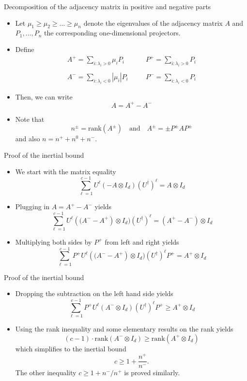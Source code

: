 \documentclass{beamer}
\renewcommand{\>}{\rangle}
\newcommand{\<}{\langle}
\begin{document}
%

\begin{frame}{Decomposition of the adjacency matrix in positive and negative parts}

\begin{itemize}
\item Let $\mu_1\ge \mu_2\ge \ldots \ge \mu_n$ denote the eigenvalues of the adjacency matrix $A$ and $P_1,\ldots,P_n$ the corresponding one-dimensional projectors.

\item Define 
\[
\begin{array}{lll}
A^+ = \sum_{i : \lambda_i > 0} \mu_i P_i & \quad &
P^+ = \sum_{i : \lambda_i > 0} P_i \\
\\
A^- = \sum_{i : \lambda_i < 0} |\mu_i| P_i & \quad &
P^- = \sum_{i : \lambda_i < 0} P_i 
\end{array}
\]
\item 
Then, we can write
\[
A = A^+ - A^-
\]
\item Note that
\[
n^{\pm} = \mathrm{rank}(A^{\pm})
\quad\mbox{and}\quad
A^{\pm} = \pm P^{\pm} A P^{\pm}
\]
and also $n=n^+ + n^0 + n^-$.
\end{itemize}

\end{frame}

%

\begin{frame}{Proof of the inertial bound}
\begin{itemize}
\item We start with the matrix equality
\[
\sum_{\ell=1}^{c-1} U^\ell (-A\otimes I_d) (U^\dagger)^\ell = A \otimes I_d
\]
\item Plugging in $A=A^+ - A^-$ yields
\[
\sum_{\ell=1}^{c-1} U^\ell \left((A^- - A^+\right) \otimes I_d) (U^\dagger)^\ell = (A^+ - A^-) \otimes I_d
\]
\item Multiplying both sides by $P^+$ from left and right yields
\[
\sum_{\ell=1}^{c-1} P^+ U^\ell \left((A^- - A^+\right) \otimes I_d) (U^\dagger)^\ell P^+= A^+ \otimes I_d
\]
\end{itemize}
\end{frame}

%

\begin{frame}{Proof of the inertial bound}
\begin{itemize}
\item Dropping the subtraction on the left hand side yields
\[
\sum_{\ell=1}^{c-1} P^+ U^\ell (A^-  \otimes I_d) (U^\dagger)^\ell P^+ \ge A^+ \otimes I_d
\]
\item Using the rank inequality and some elementary results on the rank yields
\[
(c-1) \cdot \mathrm{rank} (A^- \otimes I_d) \ge \mathrm{rank}(A^+ \otimes I_d)
\]
which simplifies to the inertial bound
\[
c \ge 1 + \frac{n^+}{n^-}.
\]
The other inequality $c \ge 1 + n^-/n^+$ is proved similarly.
\end{itemize}
\end{frame}
\end{document}
